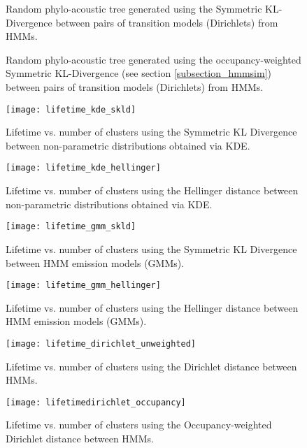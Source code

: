\begin{sidewaysfigure}[ht]
\noindent{}
    \caption{Random phylo-acoustic tree generated using the Symmetric KL-Divergence between pairs of transition models (Dirichlets) from HMMs.}
    \label{fig:rhmmunweighted}
\end{sidewaysfigure}


\begin{sidewaysfigure}[ht]
\noindent{}
    \caption{Random phylo-acoustic tree generated using the occupancy-weighted Symmetric KL-Divergence (see section \ref{subsection_hmmsim}) between pairs of transition models (Dirichlets) from HMMs.}
    \label{fig:rhmmweighted}
\end{sidewaysfigure}

\begin{figure}[t]
\centering
\texttt{[image: lifetime\_kde\_skld]}
\caption{Lifetime vs. number of clusters using the Symmetric KL Divergence between non-parametric distributions obtained via KDE.}
\label{fig_lt_kde_skld}
\end{figure}

\begin{figure}[t]
\centering
\texttt{[image: lifetime\_kde\_hellinger]}
\caption{Lifetime vs. number of clusters using the Hellinger distance between non-parametric distributions obtained via KDE.}
\label{fig_lt_kde_hellinger}
\end{figure}

\begin{figure}[t]
\centering
\texttt{[image: lifetime\_gmm\_skld]}
\caption{Lifetime vs. number of clusters using the Symmetric KL Divergence between HMM emission models (GMMs).}
\label{fig_lt_gmm_skld}
\end{figure}

\begin{figure}[t]
\centering
\texttt{[image: lifetime\_gmm\_hellinger]}
\caption{Lifetime vs. number of clusters using the Hellinger distance between HMM emission models (GMMs).}
\label{fig_lt_gmm_hellinger}
\end{figure}

\begin{figure}[t]
\centering
\texttt{[image: lifetime\_dirichlet\_unweighted]}
\caption{Lifetime vs. number of clusters using the Dirichlet distance between HMMs.}
\label{fig_lt_du}
\end{figure}

\begin{figure}[t]
\centering
\texttt{[image: lifetimedirichlet\_occupancy]}
\caption{Lifetime vs. number of clusters using the Occupancy-weighted Dirichlet distance between HMMs.}
\label{fig_lt_occ}
\end{figure}   
